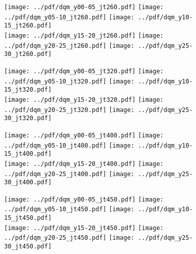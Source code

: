 \documentclass[landscape,10pt]{beamer} %
\begin{document}
\newpage

\begin{figure}[p]
\centering
\texttt{[image: ../pdf/dqm\_y00-05\_jt260.pdf]}
\texttt{[image: ../pdf/dqm\_y05-10\_jt260.pdf]}
\texttt{[image: ../pdf/dqm\_y10-15\_jt260.pdf]}\\
\texttt{[image: ../pdf/dqm\_y15-20\_jt260.pdf]}
\texttt{[image: ../pdf/dqm\_y20-25\_jt260.pdf]}
\texttt{[image: ../pdf/dqm\_y25-30\_jt260.pdf]}
\end{figure}

\newpage

\begin{figure}[p]
\centering
\texttt{[image: ../pdf/dqm\_y00-05\_jt320.pdf]}
\texttt{[image: ../pdf/dqm\_y05-10\_jt320.pdf]}
\texttt{[image: ../pdf/dqm\_y10-15\_jt320.pdf]}\\
\texttt{[image: ../pdf/dqm\_y15-20\_jt320.pdf]}
\texttt{[image: ../pdf/dqm\_y20-25\_jt320.pdf]}
\texttt{[image: ../pdf/dqm\_y25-30\_jt320.pdf]}
\end{figure}

\newpage

\begin{figure}[p]
\centering
\texttt{[image: ../pdf/dqm\_y00-05\_jt400.pdf]}
\texttt{[image: ../pdf/dqm\_y05-10\_jt400.pdf]}
\texttt{[image: ../pdf/dqm\_y10-15\_jt400.pdf]}\\
\texttt{[image: ../pdf/dqm\_y15-20\_jt400.pdf]}
\texttt{[image: ../pdf/dqm\_y20-25\_jt400.pdf]}
\texttt{[image: ../pdf/dqm\_y25-30\_jt400.pdf]}
\end{figure}

\newpage

\begin{figure}[p]
\centering
\texttt{[image: ../pdf/dqm\_y00-05\_jt450.pdf]}
\texttt{[image: ../pdf/dqm\_y05-10\_jt450.pdf]}
\texttt{[image: ../pdf/dqm\_y10-15\_jt450.pdf]}\\
\texttt{[image: ../pdf/dqm\_y15-20\_jt450.pdf]}
\texttt{[image: ../pdf/dqm\_y20-25\_jt450.pdf]}
\texttt{[image: ../pdf/dqm\_y25-30\_jt450.pdf]}
\end{figure}
\end{document}
